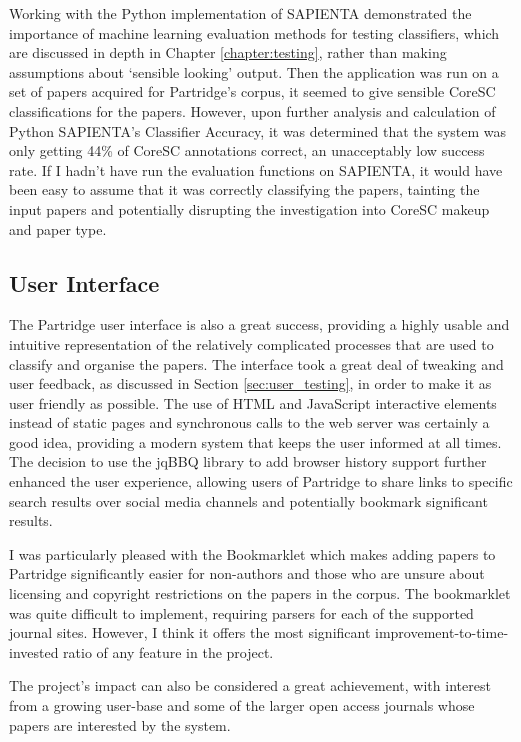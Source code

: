 Working with the Python implementation of SAPIENTA demonstrated the importance
of machine learning evaluation methods for testing classifiers, which are
discussed in depth in Chapter \ref{chapter:testing}, rather than making
assumptions about `sensible looking' output. Then the application was run on a
set of papers acquired for Partridge's corpus, it seemed to give sensible
CoreSC classifications for the papers. However, upon further analysis and
calculation of Python SAPIENTA's Classifier Accuracy, it was determined that
the system was only getting 44\% of CoreSC annotations correct, an unacceptably
low success rate. If I hadn't have run the evaluation functions on SAPIENTA, it
would have been easy to assume that it was correctly classifying the papers,
tainting the input papers and potentially disrupting the investigation into
CoreSC makeup and paper type.


\subsection{User Interface} 

The Partridge user interface is also a great success, providing a highly usable
and intuitive representation of the relatively complicated processes that are
used to classify and organise the papers. The interface took a great deal of
tweaking and user feedback, as discussed in Section \ref{sec:user_testing}, in
order to make it as user friendly as possible. The use of HTML and JavaScript
interactive elements instead of static pages and synchronous calls to the web
server was certainly a good idea, providing a modern system that keeps the user
informed at all times.  The decision to use the jqBBQ library to add browser
history support further enhanced the user experience, allowing users of
Partridge to share links to specific search results over social media channels
and potentially bookmark significant results.

I was particularly pleased with the Bookmarklet which makes adding papers to
Partridge significantly easier for non-authors and those who are unsure about
licensing and copyright restrictions on the papers in the corpus. The
bookmarklet was quite difficult to implement, requiring parsers for each of the
supported journal sites. However, I think it offers the most significant
improvement-to-time-invested ratio of any feature in the project.

The project's impact can also be considered a great achievement, with interest
from a growing user-base and some of the larger open access journals whose
papers are interested by the system.


